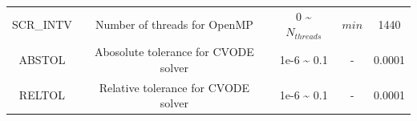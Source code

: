 \documentclass[]{scrbook}
\begin{document}
\begin{longtable}[]{@{}ccccc@{}}
\begin{minipage}[t]{0.17\columnwidth}\centering\strut
SCR\_INTV\strut
\end{minipage} & \begin{minipage}[t]{0.23\columnwidth}\centering\strut
Number of threads for OpenMP\strut
\end{minipage} & \begin{minipage}[t]{0.10\columnwidth}\centering\strut
0 \textasciitilde{} \(N_{threads}\)\strut
\end{minipage} & \begin{minipage}[t]{0.10\columnwidth}\centering\strut
\(min\)\strut
\end{minipage} & \begin{minipage}[t]{0.26\columnwidth}\centering\strut
1440\strut
\end{minipage}\tabularnewline
\begin{minipage}[t]{0.17\columnwidth}\centering\strut
ABSTOL\strut
\end{minipage} & \begin{minipage}[t]{0.23\columnwidth}\centering\strut
Abosolute tolerance for CVODE solver\strut
\end{minipage} & \begin{minipage}[t]{0.10\columnwidth}\centering\strut
1e-6 \textasciitilde{} 0.1\strut
\end{minipage} & \begin{minipage}[t]{0.10\columnwidth}\centering\strut
-\strut
\end{minipage} & \begin{minipage}[t]{0.26\columnwidth}\centering\strut
0.0001\strut
\end{minipage}\tabularnewline
\begin{minipage}[t]{0.17\columnwidth}\centering\strut
RELTOL\strut
\end{minipage} & \begin{minipage}[t]{0.23\columnwidth}\centering\strut
Relative tolerance for CVODE solver\strut
\end{minipage} & \begin{minipage}[t]{0.10\columnwidth}\centering\strut
1e-6 \textasciitilde{} 0.1\strut
\end{minipage} & \begin{minipage}[t]{0.10\columnwidth}\centering\strut
-\strut
\end{minipage} & \begin{minipage}[t]{0.26\columnwidth}\centering\strut
0.0001\strut
\end{minipage}\tabularnewline

\end{longtable}
\end{document}
